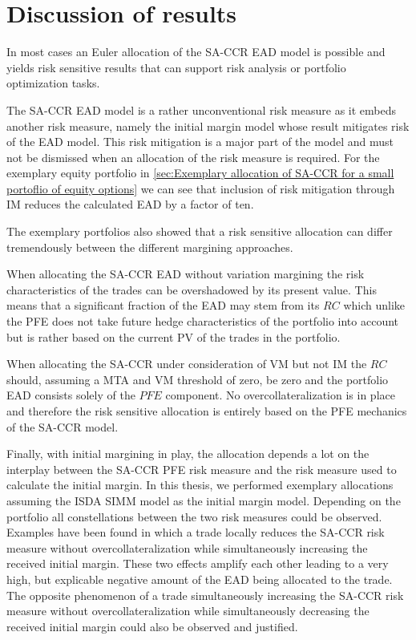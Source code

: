 \documentclass[../Thesis_AHoecherl.tex]{subfiles}
\begin{document}
    \chapter{Discussion of results}\label{sec:Discussion of results}

    In most cases an Euler allocation of the SA-CCR EAD model is possible and yields risk sensitive results that can support risk analysis or portfolio optimization tasks.

    The SA-CCR EAD model is a rather unconventional risk measure as it embeds another risk measure, namely the initial margin model whose result mitigates risk of the EAD model.
    This risk mitigation is a major part of the model and must not be dismissed when an allocation of the risk measure is required. For the exemplary equity portfolio in \ref{sec:Exemplary allocation of SA-CCR for a small portoflio of equity options} we can see that inclusion of risk mitigation through IM reduces the calculated EAD by a factor of ten.

    The exemplary portfolios also showed that a risk sensitive allocation can differ tremendously between the different margining approaches. 
    
    When allocating the SA-CCR EAD without variation margining the risk characteristics of the trades can be overshadowed by its present value. This means that a significant fraction of the EAD may stem from its $RC$ which unlike the PFE does not take future hedge characteristics of the portfolio into account but is rather based on the current PV of the trades in the portfolio.

    When allocating the SA-CCR under consideration of VM but not IM the $RC$ should, assuming a MTA and VM threshold of zero, be zero and the portfolio EAD consists solely of the $PFE$ component. No overcollateralization is in place and therefore the risk sensitive allocation is entirely based on the PFE mechanics of the SA-CCR model.

    Finally, with initial margining in play, the allocation depends a lot on the interplay between the SA-CCR PFE risk measure and the risk measure used to calculate the initial margin. In this thesis, we performed exemplary allocations assuming the ISDA SIMM model as the initial margin model. 
    Depending on the portfolio all constellations between the two risk measures could be observed. Examples have been found in which a trade locally reduces the SA-CCR risk measure without overcollateralization while simultaneously increasing the received initial margin. These two effects amplify each other leading to a very high, but explicable negative amount of the EAD being allocated to the trade. The opposite phenomenon of a trade simultaneously increasing the SA-CCR risk measure without overcollateralization while simultaneously decreasing the received initial margin could also be observed and justified.
\end{document}
